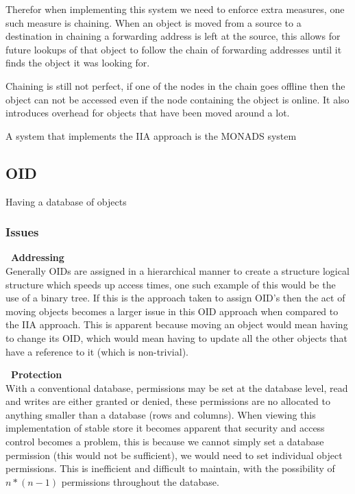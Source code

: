 \documentclass[a4paper,12pt]{article}
\begin{document}
Therefor when implementing this system we need to enforce extra measures, one such measure is chaining. 
When an object is moved from a source to a destination in chaining a forwarding address is left at the source, this allows for future lookups of that object to follow the chain of forwarding addresses until it finds the object it was looking for.

Chaining is still not perfect, if one of the nodes in the chain goes offline then the object can not be accessed even if the node containing the object is online.
It also introduces overhead for objects that have been moved around a lot.

A system that implements the IIA approach is the MONADS system
\subsection*{OID}
Having a database of objects 
\subsubsection*{Issues}
\textbf{\indent~Addressing}\\
Generally OIDs are assigned in a hierarchical manner to create a structure logical structure which speeds up access times, one such example of this would be the use of a binary tree.
If this is the approach taken to assign OID's then the act of moving objects becomes a larger issue in this OID approach when compared to the IIA approach.
This is apparent because moving an object would mean having to change its OID, which would mean having to update all the other objects that have a reference to it (which is non-trivial). 

\textbf{\indent~Protection}\\
With a conventional database, permissions may be set at the database level, read and writes are either granted or denied, these permissions are no allocated to anything smaller than a database (rows and columns).
When viewing this implementation of stable store it becomes apparent that security and access control becomes a problem, this is because we cannot simply set a database permission (this would not be sufficient), we would need to set individual object permissions.
This is inefficient and difficult to maintain, with the possibility of $n*(n-1)$ permissions throughout the database.
\end{document}

